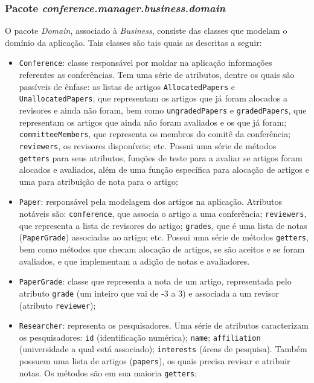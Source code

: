 \documentclass[a4paper, 12pt]{article}
\begin{document}
\subsubsection{Pacote \emph{conference.manager.business.domain}}
O pacote \emph{Domain}, associado à \emph{Business}, consiste das classes que modelam o domínio da aplicação. Tais classes são tais quais as descritas a seguir:

\begin{itemize}
\item \verb|Conference|: classe responsável por moldar na aplicação informações referentes as conferências. Tem uma série de atributos, dentre os quais são passíveis de ênfase: as listas de artigos \verb|AllocatedPapers| e \verb|UnallocatedPapers|, que representam os artigos que já foram alocados a revisores e ainda não foram, bem como \verb|ungradedPapers| e \verb|gradedPapers|, que representam os artigos que ainda não foram avaliados e os que já foram; \verb|committeeMembers|, que representa os membros do comitê da conferência; \verb|reviewers|, os revisores disponíveis; etc. Possui uma série de métodos \verb|getters| para seus atributos, funções de teste para a avaliar se artigos foram alocados e avaliados, além de uma função específica para alocação de artigos e uma para atribuição de nota para o artigo;

\item \verb|Paper|: responsável pela modelagem dos artigos na aplicação. Atributos notáveis são: \verb|conference|, que associa o artigo a uma conferência; \verb|reviewers|, que representa a lista de revisores do artigo; \verb|grades|, que é uma lista de notas (\verb|PaperGrade|) associadas ao artigo; etc. Possui uma série de métodos \verb|getters|, bem como métodos que checam alocação de artigos, se são aceitos e se foram avaliados, e que implementam a adição de notas e avaliadores.

\item \verb|PaperGrade|: classe que representa a nota de um artigo, representada pelo atributo \verb|grade| (um inteiro que vai de -3 a 3) e associada a um revisor (atributo \verb|reviewer|);

\item \verb|Researcher|: representa os pesquisadores. Uma série de atributos caracterizam os pesquisadores: \verb|id| (identificação numérica); \verb|name|; \verb|affiliation| (universidade a qual está associado); \verb|interests| (áreas de pesquisa). Também possuem uma lista de artigos  (\verb|papers|), os quais precisa revisar e atribuir notas. Os métodos são em sua maioria \verb|getters|;


\end{itemize}
\end{document}
